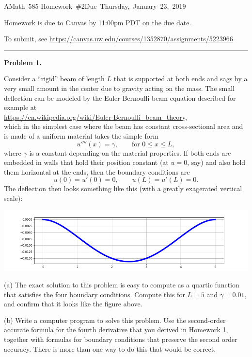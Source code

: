\documentclass[10pt]{article}
\begin{document}
\hfill\vbox{\hbox{AMath 585}
\hbox{Homework \#2}\hbox{Due Thursday, January 23, 2019}}

\vskip 5pt

Homework is due to Canvas by 11:00pm PDT on the due date.

To submit, see
\url{https://canvas.uw.edu/courses/1352870/assignments/5223966}



\vskip 1cm
\hrule
{\bf Problem 1.}

Consider a ``rigid'' beam of length $L$
that is supported at both ends and sags by a very
small amount in the center due to gravity acting on the mass.  The small
deflection can be modeled by the Euler-Bernoulli 
beam equation described for example at\\
\url{https://en.wikipedia.org/wiki/Euler-Bernoulli\_beam\_theory}, \\
which in the simplest case where the beam has constant
cross-sectional area and is made of a uniform material takes the simple form
\[
u''''(x) = \gamma, \qquad \text{for~} 0\leq x \leq L,
\]
where $\gamma$ is a constant depending on the material properties.   
If both ends are embedded in walls that hold their position constant 
(at $u=0$, say) and also hold them horizontal at the ends, then the boundary
conditions are
\[
u(0) = u'(0) = 0, \qquad u(L) = u'(L) = 0.
\]
The deflection then looks something like this (with a greatly exagerated
vertical scale):

\hfil\includegraphics[width=6.0in]{beam.png}\hfil

(a) The exact solution to this problem is easy to compute as a quartic
function that satisfies the four boundary conditions.  Compute this for
$L=5$ and $\gamma = 0.01$, and confirm that it looks like the figure above.

(b) Write a computer program to solve this problem.  Use the second-order
accurate formula for the fourth derivative that you derived in Homework 1,
together with formulas for boundary conditions that preserve the second
order accuracy.  There is more than one way to do this that would be correct.
\end{document}
